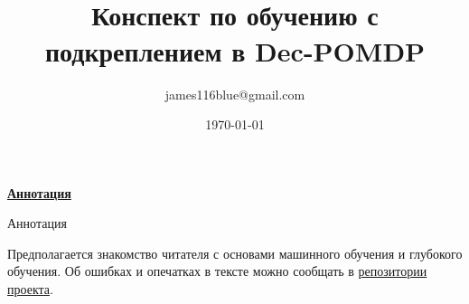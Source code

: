 \documentclass[a4paper, 10pt, oneside]{memoir}
\title{
\vspace{4cm}
\normalfont \normalsize 
\horrule{0.5pt} \\[0.4cm]
\huge Конспект по обучению с подкреплением  в Dec-POMDP
\horrule{2pt} \\[0.5cm]
}
\author{james116blue@gmail.com}
\date{\normalsize\today}
\begin{document}

\maketitle
\thispagestyle{empty}

\vspace{2.2cm}
\begin{center}
\textcolor{ChadBlue}{\underline{\textbf{Аннотация}}}
\end{center}

\vspace{0.5cm}
Аннотация

\vspace{0.3cm}
Предполагается знакомство читателя с основами машинного обучения и глубокого обучения. Об ошибках и опечатках в тексте можно сообщать в \href{https://github.com/james116blue}{репозитории проекта}.




\end{document}
